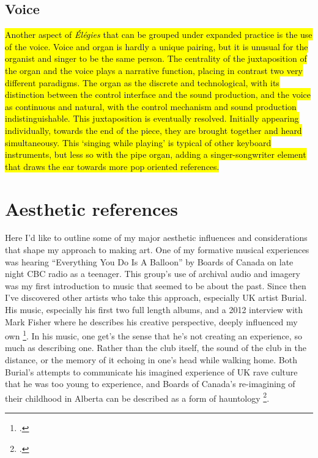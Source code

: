 \documentclass[12pt,twoside,maitrise]{dms_ks}
\theoremstyle{definition}
\begin{document}
{{\subsection{Voice}

\hl{Another aspect of \textit{Élégies} that can be grouped under expanded practice is the use of the voice. 
Voice and organ is hardly a unique pairing, but it is unusual for the organist and singer to be the same person.
The centrality of the juxtaposition of the organ and the voice plays a narrative function, placing in contrast two very different paradigms.
The organ as the discrete and technological, with its distinction between the control interface and the sound production, and the voice as continuous and natural, with the control mechanism and sound production indistinguishable. 
This juxtaposition is eventually resolved.
Initially appearing individually, towards the end of the piece, they are brought together and heard simultaneousy.
This `singing while playing' is typical of other keyboard instruments, but less so with the pipe organ, adding a singer-songwriter element that draws the ear towards more pop oriented references.}


\section{Aesthetic references}

Here I'd like to outline some of my major aesthetic influences and considerations that shape my approach to making art. 
One of my formative musical experiences was hearing “Everything You Do Is A Balloon” by Boards of Canada on late night CBC radio as a teenager. 
This group's use of archival audio and imagery was my first introduction to music that seemed to be about the past. 
Since then I've discovered other artists who take this approach, especially UK artist Burial. 
His music, especially his first two full length albums, and a 2012 interview with Mark Fisher where he describes his creative perspective, deeply influenced my own \footcite{fisher_burial_2012}. 
In his music, one get's the sense that he's not creating an experience, so much as describing one. 
Rather than the club itself, the sound of the club in the distance, or the memory of it echoing in one's head while walking home. 
Both Burial's attempts to communicate his imagined experience of UK rave culture that he was too young to experience, and Boards of Canada's re-imagining of their childhood in Alberta can be described as a form of hauntology \footcite{alary_vers_2020}.

}}
\end{document}
